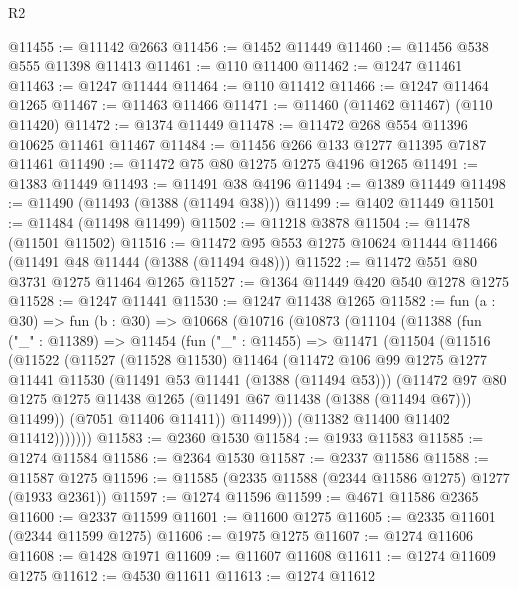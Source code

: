 \begin{lexlean}{R2}
\begin{coremodule}
@11455 := @11142 @2663
@11456 := @1452 @11449
@11460 := @11456 @538 @555 @11398 @11413
@11461 := @110 @11400
@11462 := @1247 @11461
@11463 := @1247 @11444
@11464 := @110 @11412
@11466 := @1247 @11464 @1265
@11467 := @11463 @11466
@11471 := @11460 (@11462 @11467) (@110 @11420)
@11472 := @1374 @11449
@11478 := @11472 @268 @554 @11396 @10625 @11461 @11467
@11484 := @11456 @266 @133 @1277 @11395 @7187 @11461
@11490 := @11472 @75 @80 @1275 @1275 @4196 @1265
@11491 := @1383 @11449
@11493 := @11491 @38 @4196
@11494 := @1389 @11449
@11498 := @11490 (@11493 (@1388 (@11494 @38)))
@11499 := @1402 @11449
@11501 := @11484 (@11498 @11499)
@11502 := @11218 @3878
@11504 := @11478 (@11501 @11502)
@11516 := @11472 @95 @553 @1275 @10624 @11444 @11466 (@11491 @48 @11444 (@1388 (@11494 @48)))
@11522 := @11472 @551 @80 @3731 @1275 @11464 @1265
@11527 := @1364 @11449 @420 @540 @1278 @1275
@11528 := @1247 @11441
@11530 := @1247 @11438 @1265
@11582 := fun (a : @30) =>
  fun (b : @30) =>
  @10668
    (@10716
      (@10873
        (@11104
          (@11388
            (fun ("_" : @11389) =>
            @11454
              (fun ("_" : @11455) =>
              @11471
                (@11504
                  (@11516
                    (@11522
                      (@11527
                        (@11528 @11530)
                        @11464
                        (@11472
                          @106
                          @99
                          @1275
                          @1277
                          @11441
                          @11530
                          (@11491 @53 @11441 (@1388 (@11494 @53)))
                          (@11472
                            @97
                            @80
                            @1275
                            @1275
                            @11438
                            @1265
                            (@11491 @67 @11438 (@1388 (@11494 @67)))
                            @11499))
                        (@7051 @11406 @11411))
                      @11499)))
                (@11382 @11400 @11402 @11412)))))))
@11583 := @2360 @1530
@11584 := @1933 @11583
@11585 := @1274 @11584
@11586 := @2364 @1530
@11587 := @2337 @11586
@11588 := @11587 @1275
@11596 := @11585 (@2335 @11588 (@2344 @11586 @1275) @1277 (@1933 @2361))
@11597 := @1274 @11596
@11599 := @4671 @11586 @2365
@11600 := @2337 @11599
@11601 := @11600 @1275
@11605 := @2335 @11601 (@2344 @11599 @1275)
@11606 := @1975 @1275
@11607 := @1274 @11606
@11608 := @1428 @1971
@11609 := @11607 @11608
@11611 := @1274 @11609 @1275
@11612 := @4530 @11611
@11613 := @1274 @11612

\end{coremodule}
\end{lexlean}
